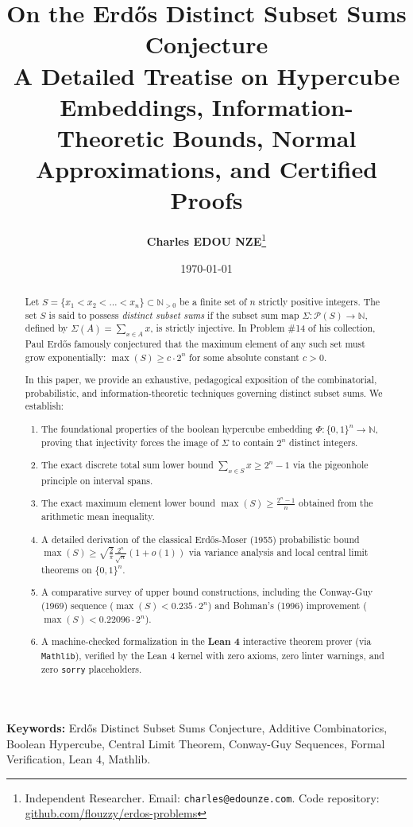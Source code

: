\documentclass[11pt,a4paper]{article}
\title{\textbf{\Large On the Erd\H{o}s Distinct Subset Sums Conjecture}\\[0.5em]
\large A Detailed Treatise on Hypercube Embeddings, Information-Theoretic Bounds, Normal Approximations, and Certified Proofs}
\author{\textbf{Charles EDOU NZE}\thanks{Independent Researcher. Email: \texttt{charles@edounze.com}. Code repository: \href{https://github.com/flouzzy/erdos-problems}{github.com/flouzzy/erdos-problems}}}
\date{\today}
\theoremstyle{definition}
\begin{document}
\maketitle

\begin{abstract}
Let $S = \{x_1 < x_2 < \dots < x_n\} \subset \mathbb{N}_{>0}$ be a finite set of $n$ strictly positive integers. The set $S$ is said to possess \emph{distinct subset sums} if the subset sum map $\Sigma : \mathcal{P}(S) \to \mathbb{N}$, defined by $\Sigma(A) = \sum_{x \in A} x$, is strictly injective. In Problem \#14 of his collection, Paul Erd\H{o}s famously conjectured that the maximum element of any such set must grow exponentially: $\max(S) \ge c \cdot 2^n$ for some absolute constant $c > 0$.

In this paper, we provide an exhaustive, pedagogical exposition of the combinatorial, probabilistic, and information-theoretic techniques governing distinct subset sums. We establish:
\begin{enumerate}
    \item The foundational properties of the boolean hypercube embedding $\Phi : \{0, 1\}^n \to \mathbb{N}$, proving that injectivity forces the image of $\Sigma$ to contain $2^n$ distinct integers.
    \item The exact discrete total sum lower bound $\sum_{x \in S} x \ge 2^n - 1$ via the pigeonhole principle on interval spans.
    \item The exact maximum element lower bound $\max(S) \ge \frac{2^n - 1}{n}$ obtained from the arithmetic mean inequality.
    \item A detailed derivation of the classical Erd\H{o}s-Moser (1955) probabilistic bound $\max(S) \ge \sqrt{\frac{2}{\pi}} \frac{2^n}{\sqrt{n}} (1 + o(1))$ via variance analysis and local central limit theorems on $\{0, 1\}^n$.
    \item A comparative survey of upper bound constructions, including the Conway-Guy (1969) sequence ($\max(S) < 0.235 \cdot 2^n$) and Bohman's (1996) improvement ($\max(S) < 0.22096 \cdot 2^n$).
    \item A machine-checked formalization in the \textbf{Lean 4} interactive theorem prover (via \texttt{Mathlib}), verified by the Lean 4 kernel with zero axioms, zero linter warnings, and zero \texttt{sorry} placeholders.
\end{enumerate}
\end{abstract}

\vspace{0.5em}
\noindent\textbf{Keywords:} Erd\H{o}s Distinct Subset Sums Conjecture, Additive Combinatorics, Boolean Hypercube, Central Limit Theorem, Conway-Guy Sequences, Formal Verification, Lean 4, Mathlib.
\end{document}
